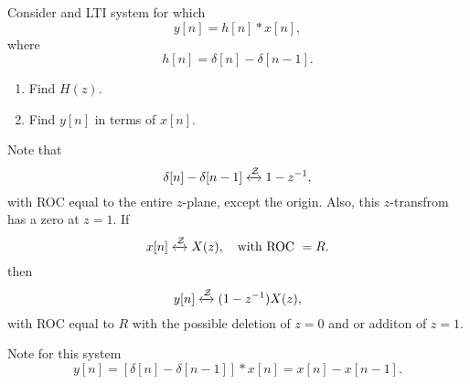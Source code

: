 \begin{frame}
    \begin{example}
        Consider and LTI system for which
        \begin{equation*}
            y[n] = h[n]\ast x[n],
        \end{equation*}
        where
        \begin{equation*}
            h[n] = \delta[n] - \delta[n-1].
        \end{equation*}

        \begin{enumerate}
            \item Find $H(z)$.
            \item Find $y[n]$ in terms of $x[n]$.
        \end{enumerate}

    \end{example}
\end{frame}


\begin{frame}
    {
        Note that
        \begin{equation*}
            \delta[n] - \delta[n-1] \xleftrightarrow{\mathcal{Z}} 1-z^{-1},
        \end{equation*}
        with ROC equal to the entire $z$-plane, except the origin. Also, this $z$-transfrom has a zero at $z=1$. If
        \begin{equation}
            x[n] \xleftrightarrow{\mathcal{Z}} X(z), \quad \text{with ROC~} = R.
        \end{equation}
        then
        \begin{equation}
            y[n] \xleftrightarrow{\mathcal{Z}} (1-z^{-1})X(z),
        \end{equation}
        with ROC equal to $R$ with the possible deletion of $z=0$ and or additon of $z=1$.\par

        Note for this system
        \begin{equation}
            y[n] = [\delta[n] - \delta[n-1] ]\ast x[n] = x[n] - x[n-1].
        \end{equation}

    }
\end{frame}




